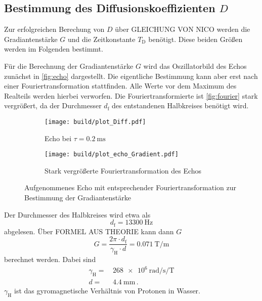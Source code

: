 \subsection{Bestimmung des Diffusionskoeffizienten $D$}
\label{ssec:aus3}

Zur erfolgreichen Berechung von $D$ über GLEICHUNG VON NICO werden die Gradiantenstärke $G$ und die Zeitkonstante $T_\text{D}$ benötigt. 
Diese beiden Größen werden im Folgenden bestimmt.

Für die Berechnung der Gradiantenstärke $G$ wird das Oszillatorbild des Echos zunächst in \autoref{fig:echo} dargestellt.
Die eigentliche Bestimmung kann aber erst nach einer Fouriertransformation stattfinden. 
Alle Werte vor dem Maximum des Realteils werden hierbei verworfen.
Die Fouriertransformierte ist \autoref{fig:fourier} stark vergrößert, da der Durchmesser $d_\text{f}$ des entstandenen Halbkreises benötigt wird.

\begin{figure}
    \centering
    \begin{subfigure}{0.4\textwidth}
        \centering
        \texttt{[image: build/plot\_Diff.pdf]}
        \caption{Echo bei $\tau = \SI{0.2}{\milli\second}$}
        \label{fig:echo}
    \end{subfigure}
    \begin{subfigure}{0.4\textwidth}
        \centering
        \texttt{[image: build/plot\_echo\_Gradient.pdf]}
        \caption{Stark vergrößerte Fouriertransformation des Echos}
        \label{fig:fourier}
    \end{subfigure}
    \caption{Aufgenommenes Echo mit entsprechender Fouriertransformation zur Bestimmung der Gradiantenstärke}
    \label{fig:g_messung}
\end{figure}

Der Durchmesser des Halbkreises wird etwa als 
\begin{equation*}
    d_\text{f} = \SI{13300}{\hertz} 
    \label{eq:df}
\end{equation*}
abgelesen.
Über FORMEL AUS THEORIE kann dann $G$ 
\begin{equation}
    G = \frac{2 \pi \cdot d_\text{f}}{\gamma _\text{H} \cdot d} = \SI{0.071}{\tesla\per\meter}
    \label{eq:g_wert}
\end{equation}
berechnet werden.
Dabei sind
\begin{align*}
    \gamma _\text{H} =& \, \SI{268e6}{\radian\per\second\per\tesla} \\
    d =& \, \SI{4.4}{\milli\meter} \, . 
\end{align*}
$\gamma _\text{H}$ ist das gyromagnetische Verhältnis von Protonen in Wasser. \cite{physics_constants}


